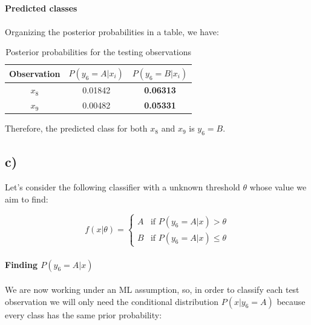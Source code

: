 \documentclass{article}
\begin{document}
\paragraph{Predicted classes}
\paragraph{}

Organizing the posterior probabilities in a table, we have:

\begin{table}[H]
\centering
\begin{tabular}{|c|c|c|}
\hline
Observation & $P(y_6=A|x_i)$ & $P(y_6=B|x_i)$ \\ \hline
$x_8$       & 0.01842         & \textbf{0.06313}        \\ \hline
$x_9$       & 0.00482         & \textbf{0.05331}        \\ \hline
\end{tabular}
\label{tab:posterior_probabilities}
\caption{Posterior probabilities for the testing observations}
\end{table}

Therefore, the predicted class for both $x_8$ and $x_9$ is $y_6=B$.

\subsection*{c)}

Let's consider the following classifier with a unknown threshold $\theta$ whose value we aim to find:

\[
  f(x|\theta) = \begin{cases}
    A & \text{if } P(y_6=A|x) > \theta \\
    B & \text{if } P(y_6=A|x) \leq \theta
  \end{cases}
\]

\paragraph{Finding $P(y_6=A|x)$}
\paragraph{}

We are now working under an ML assumption, so, in order to classify each test observation we will only need the conditional distribution $P(x|y_6=A)$ because every class has the same prior probability:
\end{document}
